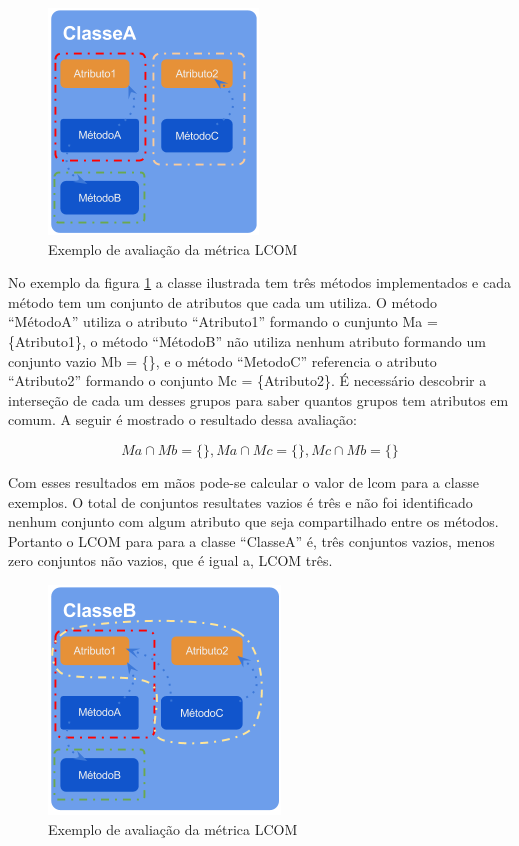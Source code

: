 \documentclass[conference]{IEEEtran}
\begin{document}
\begin{figure}[htb]
	\begin{center}
		\includegraphics[scale=0.8]{img/pic_lcom_ex1.png}
	\end{center}
	\caption{\label{fig:pic_lcom_ex1}Exemplo  de avaliação da métrica LCOM}
	
\end{figure}

No exemplo da figura \ref{fig:pic_lcom_ex1} a classe ilustrada tem três métodos
implementados e cada método tem um conjunto de atributos que cada um utiliza.
O método ``MétodoA'' utiliza o atributo ``Atributo1'' formando o cunjunto Ma =
\{Atributo1\}, o método ``MétodoB'' não utiliza nenhum atributo formando um
conjunto vazio Mb = \{\}, e o método ``MetodoC'' referencia o atributo
``Atributo2'' formando o conjunto Mc = \{Atributo2\}. É necessário descobrir a
interseção de cada um desses grupos para saber quantos grupos tem atributos em
comum. A seguir é mostrado o resultado dessa avaliação:

\[
Ma \cap Mb = \{ \},
Ma \cap Mc = \{ \},
Mc \cap Mb = \{ \}
\]

Com esses resultados em mãos pode-se calcular o valor de lcom para a classe
exemplos. O total de conjuntos resultates vazios é três  e não foi identificado
nenhum conjunto com algum atributo que seja compartilhado entre os métodos.
Portanto o LCOM para para a classe ``ClasseA'' é, três conjuntos vazios, menos
zero conjuntos não vazios, que é igual a, LCOM três.

\begin{figure}[htb]
	\begin{center}
		\includegraphics[scale=0.8]{img/pic_lcom_ex2.png}
	\end{center}
	\caption{\label{fig:pic_lcom_ex2}Exemplo  de avaliação da métrica LCOM}
	
\end{figure}
\end{document}
